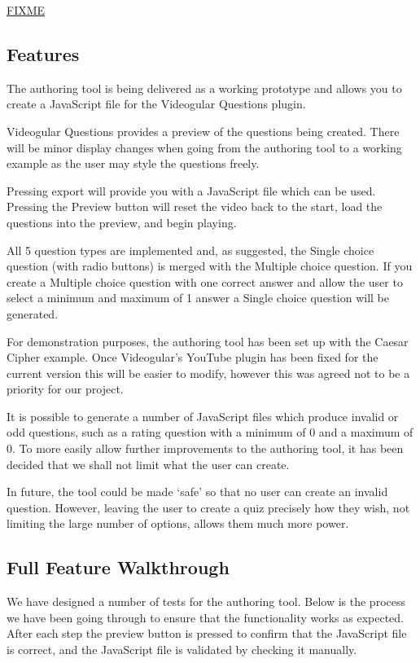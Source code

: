 \documentclass[12pt,a4paper]{article}
\begin{document}
\url{FIXME}

\subsection{Features}

The authoring tool is being delivered as a working prototype and allows you to create a JavaScript file for the Videogular Questions plugin.

Videogular Questions provides a preview of the questions being created. There will be minor display changes when going from the authoring tool to a working example as the user may style the questions freely.

Pressing export will provide you with a JavaScript file which can be used. Pressing the Preview button will reset the video back to the start, load the questions into the preview, and begin playing.

All 5 question types are implemented and, as suggested, the Single choice question (with radio buttons) is merged with the Multiple choice question. If you create a Multiple choice question with one correct answer and allow the user to select a minimum and maximum of 1 answer a Single choice question will be generated.

For demonstration purposes, the authoring tool has been set up with the Caesar Cipher example. Once Videogular's YouTube plugin has been fixed for the current version this will be easier to modify, however this was agreed not to be a priority for our project.

It is possible to generate a number of JavaScript files which produce invalid or odd questions, such as a rating question with a minimum of 0 and a maximum of 0. To more easily allow further improvements to the authoring tool, it has been decided that we shall not limit what the user can create.

In future, the tool could be made `safe' so that no user can create an invalid question. However, leaving the user to create a quiz precisely how they wish, not limiting the large number of options, allows them much more power.

\subsection{Full Feature Walkthrough}

We have designed a number of tests for the authoring tool. Below is the process we have been going through to ensure that the functionality works as expected. After each step the preview button is pressed to confirm that the JavaScript file is correct, and the JavaScript file is validated by checking it manually.
\end{document}
